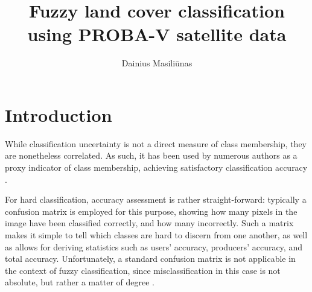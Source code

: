 \documentclass[a4paper,10pt]{article}
\title{Fuzzy land cover classification using PROBA-V satellite data}
\author{Dainius Masili\=unas}
\begin{document}
\maketitle

\begin{abstract}

\end{abstract}

\section{Introduction}

While classification uncertainty is not a direct measure of class membership, they are nonetheless correlated. As such, it has been used by numerous authors as a proxy indicator of class membership, achieving satisfactory classification accuracy \cite{foody2002accuracy}.

For hard classification, accuracy assessment is rather straight-forward: typically a confusion matrix is employed for this purpose, showing how many pixels in the image have been classified correctly, and how many incorrectly. Such a matrix makes it simple to tell which classes are hard to discern from one another, as well as allows for deriving statistics such as users' accuracy, producers' accuracy, and total accuracy. Unfortunately, a standard confusion matrix is not applicable in the context of fuzzy classification, since misclassification in this case is not absolute, but rather a matter of degree \cite{foody2002accuracy}.


\end{document}
